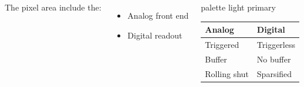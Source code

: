 \begin{frame}
            \begin{columns}
                    The pixel area include the:
                    \begin{itemize}
                        \item Analog front end
                        \item Digital readout 
                    \end{itemize} 
                    \vspace*{-0.15cm}%
                    \begin{beamercolorbox}[rounded=true, center]{palette light primary}
                        \setlength{\tabcolsep}{0.5em} %
                        {\renewcommand{\arraystretch}{1.2}%
                        \begin{tabular}{l|l}
                            Analog & Digital\\
                            \hline
                            Triggered & Triggerless\\
                            \hline
                            Buffer & No buffer \\
                            \hline
                            Rolling shut & Sparsified\\
                        \end{tabular}
                        }
                    \end{beamercolorbox}
            \end{columns}
    \end{frame} 



